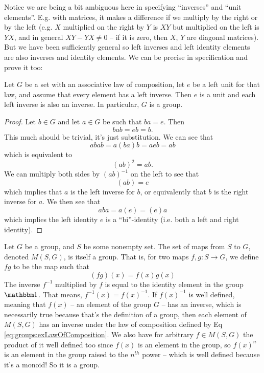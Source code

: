 Notice we are being a bit ambiguous here in specifying
``inverses'' and ``unit elements''. E.g. with matrices, it makes
a difference if we multiply by the right or by the left
(e.g. $X$ multiplied on the right by $Y$ is $XY$ but
multiplied on the left is $YX$, and in general $XY-YX\neq0$
-- if it is zero, then $X$, $Y$ are diagonal matrices). But
we have been sufficiently general so left inverses and left
identity elements are also inverses and identity
elements. We can be precise in specification and prove it
too:
\begin{prop}
Let $G$ be a set with an associative law of composition, let
$e$ be a left unit for that law, and assume that every
element has a left inverse. Then $e$ is a unit and each left
inverse is also an inverse. In particular, $G$ is a group.
\end{prop}
\begin{proof}
Let $b\in G$ and let $a\in G$ be such that $ba=e$. Then
\begin{equation}
bab = eb = b.
\end{equation} 
This much should be trivial, it's just substitution. We can
see that
\begin{equation}
abab = a(ba)b = aeb = ab
\end{equation}
which is equivalent to
\begin{equation}
(ab)^2 = ab.
\end{equation}
We can multiply both sides by $(ab)^{-1}$ on the left to see
that
\begin{equation}
(ab) = e
\end{equation}
which implies that $a$ is the left inverse for $b$, or
equivalently that $b$ is the right inverse for $a$. We then
see that
\begin{equation}
aba = a(e) = (e)a
\end{equation}
which implies the left identity $e$ is a ``bi''-identity
(i.e. both a left and right identity).
\end{proof}
\begin{ex}
Let $G$ be a group, and $S$ be some nonempty set. The set of
maps from $S$ to $G$, denoted $M(S,G)$, is itself a
group. That is, for two maps $f,g:S\to G$, we define $fg$ to
be the map such that
\begin{equation}\label{eq:groups:exLawOfComposition}
(fg)(x) = f(x)g(x)
\end{equation}
The inverse $f^{-1}$ multiplied by $f$ is equal to the
identity element in the group ${\mathbbm 1}$. That means,
$f^{-1}(x)=f(x)^{-1}$. If $f(x)^{-1}$ is well defined,
meaning that $f(x)$ -- an element of the group $G$ -- has an
inverse, which is necessarily true because that's the
definition of a group, then each element of $M(S,G)$ has an
inverse under the law of composition defined by Eq
\eqref{eq:groups:exLawOfComposition}. We also have for
arbitrary $f\in M(S,G)$ the product of it well defined too
since $f(x)$ is an element in the group, so $f(x)^n$ is an
element in the group raised to the $n^{th}$ power -- which
is well defined because it's a monoid! So it is a group.\qef
\end{ex}
